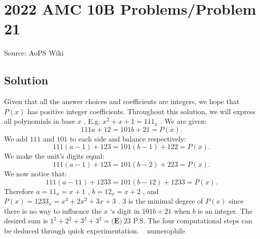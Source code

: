 \documentclass[12pt]{article}
\begin{document}
\section*{{2022 AMC 10B Problems/Problem 21}}
Source: AoPS Wiki

\subsection*{Solution}
Given that all the answer choices and coefficients are integers, we hope that $P(x)$ has positive integer coefficients. Throughout this solution, we will express all polynomials in base $x$ . E.g. $x^2 + x + 1 = 111_{x}$ . We are given: \[111a + 12 = 101b + 21 = P(x).\] We add $111$ and $101$ to each side and balance respectively: \[111(a - 1) + 123 = 101(b - 1) + 122 = P(x).\] We make the unit's digits equal: \[111(a - 1) + 123 = 101(b - 2) + 223 = P(x).\] We now notice that: \[111(a - 11) + 1233 = 101(b - 12) + 1233 = P(x).\] Therefore $a = 11_{x} = x + 1$ , $b = 12_{x} = x + 2$ , and $P(x) = 1233_{x} = x^3 + 2x^2 + 3x + 3$ . $3$ is the minimal degree of $P(x)$ since there is no way to influence the $x$ ‘s digit in $101b + 21$ when $b$ is an integer. The desired sum is $1^2 + 2^2 +3^2+ 3^2 = \boxed{\textbf{(E)} \ 23}$ P.S. The four computational steps can be deduced through quick experimentation. ~ numerophile
\end{document}
